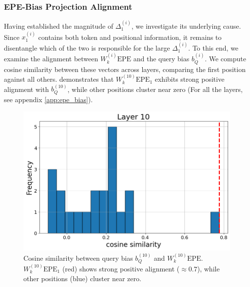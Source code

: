 \documentclass[11pt]{article}
\newif\ifBacklogcomments
\newif\ifResolvedcomments
\newcommand{\Backlog}[1]{\ifBacklogcomments\textcolor{blue}{[Backlog: #1]}\fi}
\newcommand{\Resolved}[1]{\ifResolvedcomments\textcolor{green}{[Resolved: #1]}\fi}
\begin{document}
\subsubsection{EPE-Bias Projection Alignment}
\label{sec:epe_alignment}
Having established the magnitude of $\Delta_1^{(i)}$, we investigate its underlying cause. Since $x_1^{(i)}$ contains both token and positional information, it remains to disentangle which of the two is responsible for the large $\Delta_1^{(i)}$. To this end, we examine the alignment between $W_k^{(i)}\mathrm{EPE}$ and the query bias $b_Q^{(i)}$. We compute cosine similarity between these vectors across layers, comparing the first position against all others.  demonstrates that $W_k^{(10)}\mathrm{EPE}_1$ exhibits strong positive alignment with $b_Q^{(10)}$, while other positions cluster near zero (For all the layers, see appendix \ref{app:epe_bias}). \Resolved{again regarding extending this to either have more examples in appendix or have a "meta" metric for more layers} \Backlog{If we can also do that for $x_1^{(i)}-\mathrm{EPE}_1$ and show that this isn't aligned that would be great for this paragraph (we can put it in the appendix and just write it casually. This is not top priority at all.)}

\begin{figure}[t]
  \includegraphics[width=\columnwidth]{figures/obs2_layer10.png}
  \caption{Cosine similarity between query bias $b_Q^{(10)}$ and $W_k^{(10)}\mathrm{EPE}$. $W_k^{(10)}\mathrm{EPE}_1$ (red) shows strong positive alignment ($\approx 0.7$), while other positions (blue) cluster near zero.} 
  \label{fig:obs2_layer10}
\end{figure}
\end{document}
